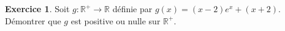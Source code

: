 \documentclass[a4paper, 11pt,openany]{article}%
\theoremstyle{plain}
\theoremstyle{definition}
\newtheorem{exo}{Exercice}
\newtheorem{sol}{Solution de l'exercice}
\theoremstyle{remark}
\newcommand{\R}{\mathbb{R}}
\newcommand{\Z}{\mathbb{Z}}
\begin{document}




\begin{exo}
Soit $g:\R^+ \to \R$ définie par $g(x)=(x-2)e^x+(x+2)$. Démontrer que $g$ est positive ou nulle sur $\R^+$.
\end{exo}

%
\end{document}
